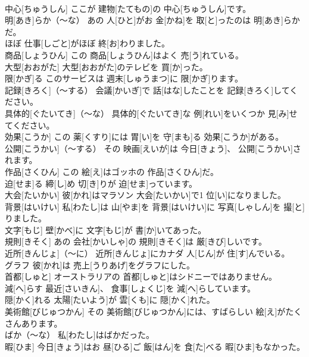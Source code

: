 \documentclass[8pt]{extreport}
\begin{document}
\begin{CJK}{UTF8}{min}
\\	中心[ちゅうしん]	ここが 建物[たてもの]の 中心[ちゅうしん]です。		
\\	明[あき]らか（～な）	あの 人[ひと]がお 金[かね]を 取[と]ったのは 明[あき]らかだ。		
\\	ほぼ	仕事[しごと]がほぼ 終[お]わりました。		
\\	商品[しょうひん]	この 商品[しょうひん]はよく 売[う]れている。		
\\	大型[おおがた]	大型[おおがた]のテレビを 買[か]った。		
\\	限[かぎ]る	このサービスは 週末[しゅうまつ]に 限[かぎ]ります。		
\\	記録[きろく]（～する）	会議[かいぎ]で 話[はな]したことを 記録[きろく]してください。		
\\	具体的[ぐたいてき]（～な）	具体的[ぐたいてき]な 例[れい]をいくつか 見[み]せてください。		
\\	効果[こうか]	この 薬[くすり]には 胃[い]を 守[まも]る 効果[こうか]がある。		
\\	公開[こうかい]（～する）	その 映画[えいが]は 今日[きょう]、 公開[こうかい]されます。		
\\	作品[さくひん]	この 絵[え]はゴッホの 作品[さくひん]だ。		
\\	迫[せま]る	締[し]め 切[き]りが 迫[せま]っています。		
\\	大会[たいかい]	彼[かれ]はマラソン 大会[たいかい]で1 位[い]になりました。		
\\	背景[はいけい]	私[わたし]は 山[やま]を 背景[はいけい]に 写真[しゃしん]を 撮[と]りました。		
\\	文字[もじ]	壁[かべ]に 文字[もじ]が 書[か]いてあった。		
\\	規則[きそく]	あの 会社[かいしゃ]の 規則[きそく]は 厳[きび]しいです。		
\\	近所[きんじょ]（～に）	近所[きんじょ]にカナダ 人[じん]が 住[す]んでいる。		
\\	グラフ	彼[かれ]は 売上[うりあげ]をグラフにした。		
\\	首都[しゅと]	オーストラリアの 首都[しゅと]はシドニーではありません。		
\\	減[へ]らす	最近[さいきん]、 食事[しょくじ]を 減[へ]らしています。		
\\	隠[かく]れる	太陽[たいよう]が 雲[くも]に 隠[かく]れた。		
\\	美術館[びじゅつかん]	その 美術館[びじゅつかん]には、すばらしい 絵[え]がたくさんあります。		
\\	ばか（～な）	私[わたし]はばかだった。		
\\	暇[ひま]	今日[きょう]はお 昼[ひる]ご 飯[はん]を 食[た]べる 暇[ひま]もなかった。		

\end{CJK}
\end{document}
